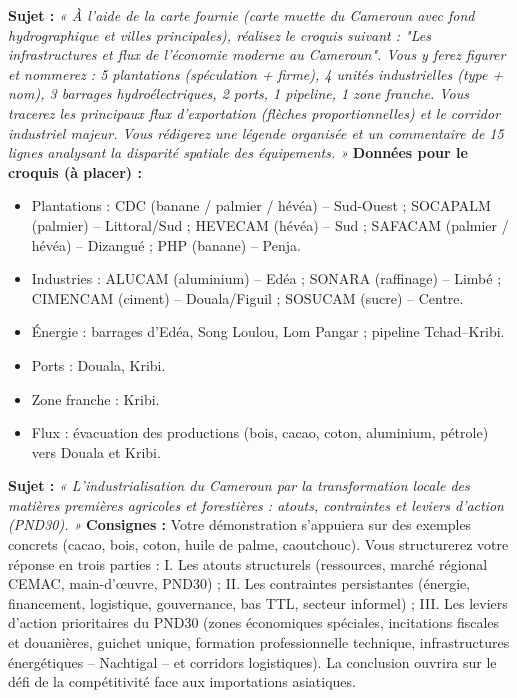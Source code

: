\documentclass[11pt]{article}
\newcommand{\cle}[1]{{\popxbold\color{popdark}#1}}
\begin{document}
\begin{exercice}
\textbf{Sujet :} \emph{« À l'aide de la carte fournie (carte muette du Cameroun avec fond hydrographique et villes principales), réalisez le croquis suivant : "Les infrastructures et flux de l'économie moderne au Cameroun". Vous y ferez figurer et nommerez : 5 plantations (spéculation + firme), 4 unités industrielles (type + nom), 3 barrages hydroélectriques, 2 ports, 1 pipeline, 1 zone franche. Vous tracerez les principaux flux d'exportation (flèches proportionnelles) et le corridor industriel majeur. Vous rédigerez une légende organisée et un commentaire de 15 lignes analysant la disparité spatiale des équipements. »}
\textbf{Données pour le croquis (à placer) :}
\begin{itemize}
    \item Plantations : CDC (banane / palmier / hévéa) -- Sud-Ouest ; SOCAPALM (palmier) -- Littoral/Sud ; HEVECAM (hévéa) -- Sud ; SAFACAM (palmier / hévéa) -- Dizangué ; PHP (banane) -- Penja.
    \item Industries : ALUCAM (aluminium) -- Edéa ; SONARA (raffinage) -- Limbé ; CIMENCAM (ciment) -- Douala/Figuil ; SOSUCAM (sucre) -- Centre.
    \item Énergie : barrages d'Edéa, Song Loulou, Lom Pangar ; pipeline Tchad--Kribi.
    \item Ports : Douala, Kribi.
    \item Zone franche : Kribi.
    \item Flux : évacuation des productions (bois, cacao, coton, aluminium, pétrole) vers Douala et Kribi.
\end{itemize}
\end{exercice}

\begin{exercice}
\textbf{Sujet :} \emph{« L'industrialisation du Cameroun par la transformation locale des matières premières agricoles et forestières : atouts, contraintes et leviers d'action (PND30). »}
\textbf{Consignes :} Votre démonstration s'appuiera sur des exemples concrets (cacao, bois, coton, huile de palme, caoutchouc). Vous structurerez votre réponse en trois parties : I. Les atouts structurels (ressources, marché régional CEMAC, main-d'œuvre, PND30) ; II. Les contraintes persistantes (énergie, financement, logistique, gouvernance, bas TTL, secteur informel) ; III. Les leviers d'action prioritaires du PND30 (zones économiques spéciales, incitations fiscales et douanières, guichet unique, formation professionnelle technique, infrastructures énergétiques -- Nachtigal -- et corridors logistiques). La conclusion ouvrira sur le défi de la \cle{compétitivité} face aux importations asiatiques.
\end{exercice}
\end{document}
